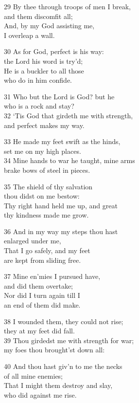 29 By thee through troops of men I break,\\
and them discomfit all;\\
And, by my God assisting me,\\
I overleap a wall.

30 As for God, perfect is his way:\\
the Lord his word is try’d;\\
He is a buckler to all those\\
who do in him confide.

31 Who but the Lord is God? but he\\
who is a rock and stay?\\
32 ‘Tis God that girdeth me with strength,\\
and perfect makes my way.

33 He made my feet swift as the hinds,\\
set me on my high places.\\
34 Mine hands to war he taught, mine arms\\
brake bows of steel in pieces.

35 The shield of thy salvation\\
thou didst on me bestow:\\
Thy right hand held me up, and great\\
thy kindness made me grow.

36 And in my way my steps thou hast\\
enlarged under me,\\
That I go safely, and my feet\\
are kept from sliding free.

37 Mine en’mies I pursued have,\\
and did them overtake;\\
Nor did I turn again till I\\
an end of them did make.

38 I wounded them, they could not rise;\\
they at my feet did fall.\\
39 Thou girdedst me with strength for war;\\
my foes thou brought’st down all:

40 And thou hast giv’n to me the necks\\
of all mine enemies;\\
That I might them destroy and slay,\\
who did against me rise.

